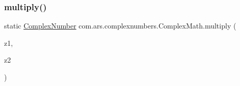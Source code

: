 \subsubsection{\texorpdfstring{multiply()}{multiply()}\hspace{0.1cm}{\footnotesize\ttfamily [1/2]}}
{\footnotesize\ttfamily static \hyperlink{classcom_1_1ars_1_1complexnumbers_1_1_complex_number}{Complex\+Number} com.\+ars.\+complexnumbers.\+Complex\+Math.\+multiply (\begin{DoxyParamCaption}\item[{\hyperlink{classcom_1_1ars_1_1complexnumbers_1_1_complex_number}{Complex\+Number}}]{z1,  }\item[{\hyperlink{classcom_1_1ars_1_1complexnumbers_1_1_complex_number}{Complex\+Number}}]{z2 }\end{DoxyParamCaption})\hspace{0.3cm}{\ttfamily [static]}}

